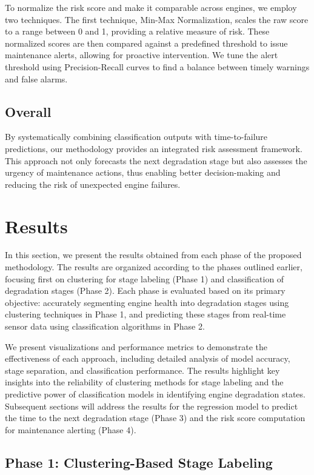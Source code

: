 \documentclass[conference]{IEEEtran}
\begin{document}
To normalize the risk score and make it comparable across engines, we employ two techniques. The first technique, Min-Max Normalization, scales the raw score to a range between 0 and 1, providing a relative measure of risk. These normalized scores are then compared against a predefined threshold to issue maintenance alerts, allowing for proactive intervention. We tune the alert threshold using Precision-Recall curves to find a balance between timely warnings and false alarms.


\subsection{Overall}
By systematically combining classification outputs with time-to-failure predictions, our methodology provides an integrated risk assessment framework. This approach not only forecasts the next degradation stage but also assesses the urgency of maintenance actions, thus enabling better decision-making and reducing the risk of unexpected engine failures.

\section{Results}
In this section, we present the results obtained from each phase of the proposed methodology. The results are organized according to the phases outlined earlier, focusing first on clustering for stage labeling (Phase 1) and classification of degradation stages (Phase 2). Each phase is evaluated based on its primary objective: accurately segmenting engine health into degradation stages using clustering techniques in Phase 1, and predicting these stages from real-time sensor data using classification algorithms in Phase 2. 

We present visualizations and performance metrics to demonstrate the effectiveness of each approach, including detailed analysis of model accuracy, stage separation, and classification performance. The results highlight key insights into the reliability of clustering methods for stage labeling and the predictive power of classification models in identifying engine degradation states. Subsequent sections will address the results for the regression model to predict the time to the next degradation stage (Phase 3) and the risk score computation for maintenance alerting (Phase 4).


\subsection{Phase 1: Clustering-Based Stage Labeling}
\end{document}
